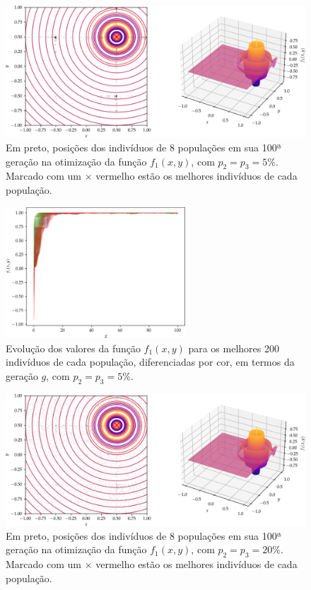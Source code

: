 \begin{figure}[p]
  \centering
  \includegraphics[width=\textwidth]{imagens/low_prob/position_damped_cossine.png}
  \caption{
    Em preto, posições dos indivíduos de 8 populações em sua 100ª geração na otimização da função
    $ f_1(x,y) $, com $ p_2 = p_3 = 5\% $. Marcado com um $\times$ vermelho estão os 
    melhores indivíduos de cada população.
  }
  \label{fig:position_damped_cossine}
\end{figure}

\begin{figure}[p]
  \centering
  \includegraphics[width=0.6\textwidth]{imagens/low_prob/evolution_damped_cossine.png}
  \caption{
    Evolução dos valores da função $ f_1(x,y) $ para os
    melhores 200 indivíduos de cada população, diferenciadas por cor, em termos da geração $g$,
    com $ p_2 = p_3 = 5\% $.
  }
  \label{fig:evolution_damped_cossine}
\end{figure}

\begin{figure}[p]
  \centering
  \includegraphics[width=\textwidth]{imagens/high_prob/position_damped_cossine.png}
  \caption{
    Em preto, posições dos indivíduos de 8 populações em sua 100ª geração na otimização da função
    $ f_1(x,y) $, com $ p_2 = p_3 = 20\% $. Marcado com um $\times$ vermelho estão os 
    melhores indivíduos de cada população.
  }
  \label{fig:position_damped_cossine_mut_20}
\end{figure}

